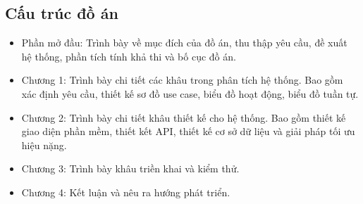 \subsection*{Cấu trúc đồ án}

\begin{adjustwidth}{1.5em}{}
\begin{itemize}
  \item Phần mở đầu: Trình bày về mục đích của đồ án, thu thập yêu cầu, đề xuất hệ thống, phần tích tính khả thi và bố cục đồ án.
  \item Chương 1: Trình bày chi tiết các khâu trong phân tích hệ thống. 
  Bao gồm xác định yêu cầu, thiết kế sơ đồ use case, biểu đồ hoạt động, biểu đồ tuần tự.
  \item Chương 2: Trình bày chi tiết khâu thiết kế cho hệ thống. Bao gồm thiết kế giao diện phần mềm, thiết kết API, thiết kế cơ sở dữ liệu
  và giải pháp tối ưu hiệu nặng.
  \item Chương 3: Trình bày khâu triền khai và kiểm thử.
  \item Chương 4: Kết luận và nêu ra hướng phát triển.
 
\end{itemize}
\end{adjustwidth}


\cleardoublepage


